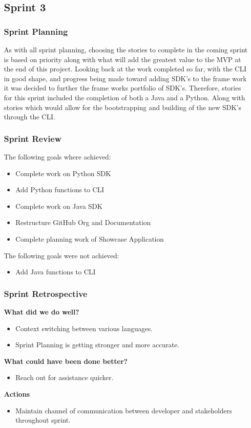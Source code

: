\subsection{Sprint 3}
\subsubsection{Sprint Planning}
As with all sprint planning, choosing the stories to complete in the coming sprint is based on priority along with what will add the greatest value to the MVP at the end of this project. Looking back at the work completed so far, with the CLI in good shape, and progress being made toward adding SDK's to the frame work it was decided to further the frame works portfolio of SDK's. Therefore, stories for this sprint included the completion of both a Java and a Python. Along with stories which would allow for the bootstrapping and building of the new SDK's through the CLI.
\subsubsection{Sprint Review}
The following goals where achieved:
\begin{itemize}
    \item Complete work on Python SDK
    \item Add Python functions to CLI
    \item Complete work on Java SDK
    \item Restructure GitHub Org and Documentation
    \item Complete planning work of Showcase Application
\end{itemize}
The following goals were not achieved:
\begin{itemize}
    \item Add Java functions to CLI
\end{itemize}
\subsubsection{Sprint Retrospective}
\textbf{What did we do well?}
\begin{itemize}
    \item Context switching between various languages.
    \item Sprint Planning is getting stronger and more accurate. 
\end{itemize}
\textbf{What could have been done better?}
\begin{itemize}
    \item Reach out for assistance quicker.
\end{itemize}
\textbf{Actions}
\begin{itemize}
    \item Maintain channel of communication between developer and stakeholders throughout sprint.
\end{itemize}
